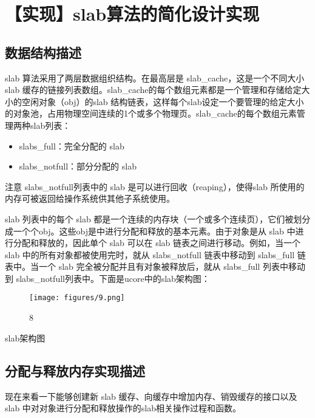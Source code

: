 \section{【实现】slab算法的简化设计实现}\label{ux5b9eux73b0slabux7b97ux6cd5ux7684ux7b80ux5316ux8bbeux8ba1ux5b9eux73b0}

\subsection{数据结构描述}\label{ux6570ux636eux7ed3ux6784ux63cfux8ff0}

slab 算法采用了两层数据组织结构。在最高层是
slab\_cache，这是一个不同大小slab
缓存的链接列表数组。slab\_cache的每个数组元素都是一个管理和存储给定大小的空闲对象（obj）的slab
结构链表，这样每个slab设定一个要管理的给定大小的对象池，占用物理空间连续的1个或多个物理页。slab\_cache的每个数组元素管理两种slab列表：

\begin{itemize}
\item
  slabs\_full：完全分配的 slab
\item
  slabs\_notfull：部分分配的 slab
\end{itemize}

注意 slabs\_notfull列表中的 slab 是可以进行回收（reaping），使得slab
所使用的内存可被返回给操作系统供其他子系统使用。

slab 列表中的每个 slab
都是一个连续的内存块（一个或多个连续页），它们被划分成一个个obj。这些obj是中进行分配和释放的基本元素。由于对象是从
slab 中进行分配和释放的，因此单个 slab 可以在 slab
链表之间进行移动。例如，当一个 slab 中的所有对象都被使用完时，就从
slabs\_notfull 链表中移动到 slabs\_full 链表中。当一个 slab
完全被分配并且有对象被释放后，就从 slabs\_full 列表中移动到
slabs\_notfull列表中。下面是ucore中的slab架构图：

\begin{figure}[htbp]
\centering
\texttt{[image: figures/9.png]}
\caption{8}
\end{figure}

slab架构图

\subsection{分配与释放内存实现描述}\label{ux5206ux914dux4e0eux91caux653eux5185ux5b58ux5b9eux73b0ux63cfux8ff0}

现在来看一下能够创建新 slab 缓存、向缓存中增加内存、销毁缓存的接口以及
slab 中对对象进行分配和释放操作的slab相关操作过程和函数。

